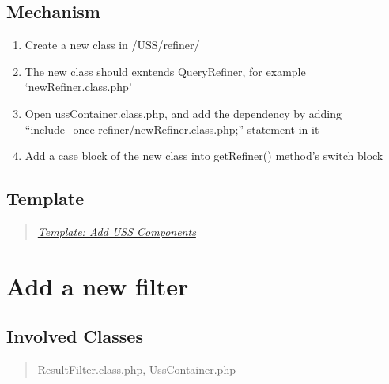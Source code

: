 \documentclass[letterpaper,10pt,english]{sphinxmanual}
\begin{document}
\subsection{Mechanism}
\label{docs/hooks/new_refiner:mechanism}\begin{enumerate}
\item {} 
Create a new class in /USS/refiner/

\item {} 
The new class should exntends QueryRefiner, for example `newRefiner.class.php'

\item {} 
Open ussContainer.class.php, and add the dependency by adding ``include\_once refiner/newRefiner.class.php;'' statement in it

\item {} 
Add a case block of the new class into getRefiner() method's switch block

\end{enumerate}


\subsection{Template}
\label{docs/hooks/new_refiner:template}\begin{quote}

{\hyperref[docs/hooks/t_uss_components:hook-template-uss]{\emph{Template: Add USS Components}}}
\end{quote}


\section{Add a new filter}
\label{docs/hooks/new_filter:hook-filter}\label{docs/hooks/new_filter::doc}\label{docs/hooks/new_filter:add-a-new-filter}

\subsection{Involved Classes}
\label{docs/hooks/new_filter:involved-classes}\begin{quote}

ResultFilter.class.php, UssContainer.php
\end{quote}
\end{document}
